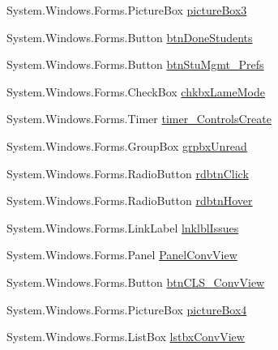 \begin{DoxyCompactItemize}
\item 
\-System.\-Windows.\-Forms.\-Picture\-Box \hyperlink{class_sr_p___classroom_inq_1_1frm_classrrom_inq_a1320c0263001c5045f415d68935ae50e}{picture\-Box3}
\item 
\-System.\-Windows.\-Forms.\-Button \hyperlink{class_sr_p___classroom_inq_1_1frm_classrrom_inq_a9225d189a561ae3a5b9f68ca3c004351}{btn\-Done\-Students}
\item 
\-System.\-Windows.\-Forms.\-Button \hyperlink{class_sr_p___classroom_inq_1_1frm_classrrom_inq_af14017019a644ec6c1d32d49fb0e59f1}{btn\-Stu\-Mgmt\-\_\-\-Prefs}
\item 
\-System.\-Windows.\-Forms.\-Check\-Box \hyperlink{class_sr_p___classroom_inq_1_1frm_classrrom_inq_ae2a9d3b663f7c88374a93c3cd9ef6eca}{chkbx\-Lame\-Mode}
\item 
\-System.\-Windows.\-Forms.\-Timer \hyperlink{class_sr_p___classroom_inq_1_1frm_classrrom_inq_aa53f33f4a7245799242c52b4ceff8dab}{timer\-\_\-\-Controls\-Create}
\item 
\-System.\-Windows.\-Forms.\-Group\-Box \hyperlink{class_sr_p___classroom_inq_1_1frm_classrrom_inq_a0e65b517d6f3d5bc8e159ff6283dc508}{grpbx\-Unread}
\item 
\-System.\-Windows.\-Forms.\-Radio\-Button \hyperlink{class_sr_p___classroom_inq_1_1frm_classrrom_inq_a116a0f948fdc7187ae7dc028026eec59}{rdbtn\-Click}
\item 
\-System.\-Windows.\-Forms.\-Radio\-Button \hyperlink{class_sr_p___classroom_inq_1_1frm_classrrom_inq_a2bee4d450744662c189d99c17658dac7}{rdbtn\-Hover}
\item 
\-System.\-Windows.\-Forms.\-Link\-Label \hyperlink{class_sr_p___classroom_inq_1_1frm_classrrom_inq_a814cf817eced89d772f9cba1053bf81b}{lnklbl\-Issues}
\item 
\-System.\-Windows.\-Forms.\-Panel \hyperlink{class_sr_p___classroom_inq_1_1frm_classrrom_inq_ae5d62ffd766ae877bf37d56567d836d5}{\-Panel\-Conv\-View}
\item 
\-System.\-Windows.\-Forms.\-Button \hyperlink{class_sr_p___classroom_inq_1_1frm_classrrom_inq_a2e74908e00f7502b511e8726d1574d7e}{btn\-C\-L\-S\-\_\-\-Conv\-View}
\item 
\-System.\-Windows.\-Forms.\-Picture\-Box \hyperlink{class_sr_p___classroom_inq_1_1frm_classrrom_inq_ab68823cc3bc21a92261c2cd687b8d85f}{picture\-Box4}
\item 
\-System.\-Windows.\-Forms.\-List\-Box \hyperlink{class_sr_p___classroom_inq_1_1frm_classrrom_inq_aa78736e6fefabc449eb2ac37ce4f5f60}{lstbx\-Conv\-View}

\end{DoxyCompactItemize}
